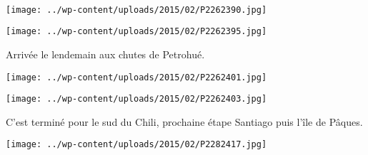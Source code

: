 \pagebreak
~
\begin{center} \texttt{[image: ../wp-content/uploads/2015/02/P2262390.jpg]} \end{center}
\begin{center} \texttt{[image: ../wp-content/uploads/2015/02/P2262395.jpg]} \end{center}
\vspace{-\topsep}
\vspace{-3.25mm}

\pagebreak
Arrivée le lendemain aux chutes de Petrohué.
\begin{center} \texttt{[image: ../wp-content/uploads/2015/02/P2262401.jpg]} \end{center}
\begin{center} \texttt{[image: ../wp-content/uploads/2015/02/P2262403.jpg]} \end{center}
\vspace{-\topsep}
\vspace{-3.25mm}

\pagebreak
 C'est terminé pour le sud du Chili, prochaine étape Santiago puis l'île de Pâques.
\begin{center} \texttt{[image: ../wp-content/uploads/2015/02/P2282417.jpg]} \end{center}
